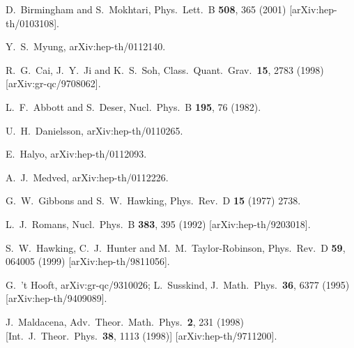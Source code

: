\documentclass[a4paper,12pt]{article}
\begin{document}
\begin{thebibliography}{99}
D.~Birmingham and S.~Mokhtari,
Phys.\ Lett.\ B {\bf 508}, 365 (2001)
[arXiv:hep-th/0103108].


Y.~S.~Myung,
arXiv:hep-th/0112140.

R.~G.~Cai, J.~Y.~Ji and K.~S.~Soh,
Class.\ Quant.\ Grav.\  {\bf 15}, 2783 (1998)
[arXiv:gr-qc/9708062].

L.~F.~Abbott and S.~Deser,
Nucl.\ Phys.\ B {\bf 195}, 76 (1982).


U.~H.~Danielsson,
arXiv:hep-th/0110265.

E.~Halyo,
arXiv:hep-th/0112093.

A.~J.~Medved,
arXiv:hep-th/0112226.


G.~W.~Gibbons and S.~W.~Hawking,
Phys.\ Rev.\ D {\bf 15} (1977) 2738.

L.~J.~Romans,
Nucl.\ Phys.\ B {\bf 383}, 395 (1992)
[arXiv:hep-th/9203018].

S.~W.~Hawking, C.~J.~Hunter and M.~M.~Taylor-Robinson,
Phys.\ Rev.\ D {\bf 59}, 064005 (1999)
[arXiv:hep-th/9811056].

G.~'t Hooft,
arXiv:gr-qc/9310026; 
L.~Susskind,
J.\ Math.\ Phys.\  {\bf 36}, 6377 (1995)
[arXiv:hep-th/9409089].

J.~Maldacena,
Adv.\ Theor.\ Math.\ Phys.\  {\bf 2}, 231 (1998)
[Int.\ J.\ Theor.\ Phys.\  {\bf 38}, 1113 (1998)]
[arXiv:hep-th/9711200].


\end{thebibliography}
\end{document}
